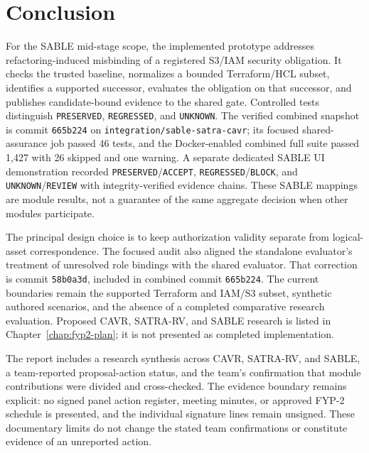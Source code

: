 \chapter{Conclusion}
\begin{sloppypar}
For the SABLE mid-stage scope, the implemented prototype addresses refactoring-induced misbinding of a registered S3/IAM security obligation. It checks the trusted baseline, normalizes a bounded Terraform/HCL subset, identifies a supported successor, evaluates the obligation on that successor, and publishes candidate-bound evidence to the shared gate. Controlled tests distinguish \texttt{PRESERVED}, \texttt{REGRESSED}, and \texttt{UNKNOWN}. The verified combined snapshot is commit \texttt{665b224} on \texttt{integration/sable-satra-cavr}; its focused shared-assurance job passed 46 tests, and the Docker-enabled combined full suite passed 1,427 with 26 skipped and one warning. A separate dedicated SABLE UI demonstration recorded \texttt{PRESERVED}/\texttt{ACCEPT}, \texttt{REGRESSED}/\texttt{BLOCK}, and \texttt{UNKNOWN}/\texttt{REVIEW} with integrity-verified evidence chains. These SABLE mappings are module results, not a guarantee of the same aggregate decision when other modules participate.
\end{sloppypar}

The principal design choice is to keep authorization validity separate from logical-asset correspondence. The focused audit also aligned the standalone evaluator's treatment of unresolved role bindings with the shared evaluator. That correction is commit \texttt{58b0a3d}, included in combined commit \texttt{665b224}. The current boundaries remain the supported Terraform and IAM/S3 subset, synthetic authored scenarios, and the absence of a completed comparative research evaluation. Proposed CAVR, SATRA-RV, and SABLE research is listed in Chapter~\ref{chap:fyp2-plan}; it is not presented as completed implementation.

The report includes a research synthesis across CAVR, SATRA-RV, and SABLE, a team-reported proposal-action status, and the team's confirmation that module contributions were divided and cross-checked. The evidence boundary remains explicit: no signed panel action register, meeting minutes, or approved FYP-2 schedule is presented, and the individual signature lines remain unsigned. These documentary limits do not change the stated team confirmations or constitute evidence of an unreported action.
